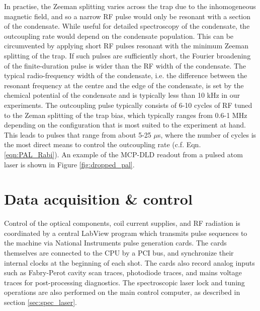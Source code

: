 	In practise, the Zeeman splitting varies across the trap due to the inhomogeneous magnetic field, and so a narrow RF pulse would only be resonant with a section of the condensate.
	While useful for detailed spectroscopy of the condensate, the outcoupling rate would depend on the condensate population.
	This can be circumvented by applying short RF pulses resonant with the minimum Zeeman splitting of the trap.
	If such pulses are sufficiently short, the Fourier broadening of the finite-duration pulse is wider than the RF width of the condensate.
	The typical radio-frequency width of the condensate, i.e.
	the difference between the resonant frequency at the centre and the edge of the condensate, is set by the chemical potential of the condensate and is typically less than 10 kHz in our experiments.
	The outcoupling pulse typically consists of 6-10 cycles of RF tuned to the Zeman splitting of the trap bias, which typically ranges from 0.6-1 MHz depending on the configuration that is most suited to the experiment at hand. 
	This leads to pulses that range from about 5-25 $\mu$s, where the number of cycles is the most direct means to control the outcoupling rate (c.f. Eqn. \ref{eqn:PAL_Rabi}).
	An example of the MCP-DLD readout from a pulsed atom laser is shown in Figure \ref{fig:dropped_pal}.

	
	
	



% 




	


\section{Data acquisition \& control}
\label{sec:DAQ}
	
	Control of the optical components, coil current supplies, and RF radiation is coordinated by a central LabView program which transmits pulse sequences to the machine via National Instruments pulse generation cards.
	The cards themselves are connected to the CPU by a PCI bus, and synchronize their internal clocks at the beginning of each shot.
	The cards also record analog inputs such as Fabry-Perot cavity scan traces, photodiode traces, and mains voltage traces for post-processing diagnostics.
	The spectroscopic laser lock and tuning operations are also performed on the main control computer, as described in section \ref{sec:spec_laser}.

